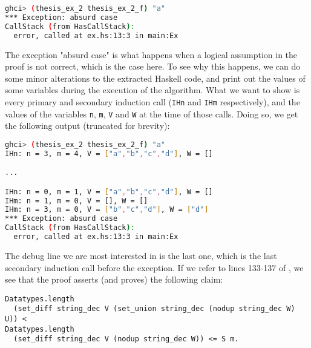 \begin{minipage}{\linewidth}
\begin{lstlisting}[language=bash, label={lst:thm_32_haskell_output_extended}, caption={Output of \lstinline{thm_32} example extended}]
ghci> (thesis_ex_2 thesis_ex_2_f) "a"
*** Exception: absurd case
CallStack (from HasCallStack):
  error, called at ex.hs:13:3 in main:Ex
\end{lstlisting}
\end{minipage}

The exception "absurd case" is what happens when a logical assumption in the proof
is not correct, which is the case here.
To see why this happens, we can do some minor alterations to the extracted Haskell code,
and print out the values of some variables during the execution of the algorithm.
What we want to show is every primary and secondary induction call (\lstinline{IHn} and \lstinline{IHm} respectively),
and the values of the variables \lstinline{n}, \lstinline{m}, \lstinline{V} and \lstinline{W} at the time of those calls.
Doing so, we get the following output (truncated for brevity):

\begin{minipage}{\linewidth}
\begin{lstlisting}[language=bash, label={lst:thm_32_haskell_output_extended_debug}, caption={Output of \lstinline{thm_32} example extended, with debug}]
ghci> (thesis_ex_2 thesis_ex_2_f) "a"
IHn: n = 3, m = 4, V = ["a","b","c","d"], W = []

...

IHn: n = 0, m = 1, V = ["a","b","c","d"], W = []
IHm: n = 1, m = 0, V = [], W = []
IHm: n = 3, m = 0, V = ["b","c","d"], W = ["d"]
*** Exception: absurd case
CallStack (from HasCallStack):
  error, called at ex.hs:13:3 in main:Ex
\end{lstlisting}
\end{minipage}

The debug line we are most interested in is the last one,
which is the last secondary induction call before the exception.
If we refer to lines 133-137 of ,
we see that the proof asserts (and proves) the following claim:

\begin{minipage}{\linewidth}
\begin{lstlisting}[language=Coq, label={lst:thm_32_false_claim}, caption={False claim in \lstinline{thm_32} proof}]
Datatypes.length
  (set_diff string_dec V (set_union string_dec (nodup string_dec W) U)) <
Datatypes.length
  (set_diff string_dec V (nodup string_dec W)) <= S m.
\end{lstlisting}
\end{minipage}

